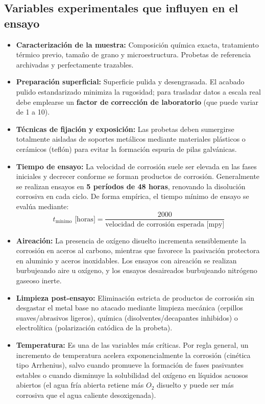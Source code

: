 \subsection{Variables experimentales que influyen en el ensayo}
\begin{itemize}
    \item \textbf{Caracterización de la muestra:} Composición química exacta, tratamiento térmico previo, tamaño de grano y microestructura. Probetas de referencia archivadas y perfectamente trazables.
    \item \textbf{Preparación superficial:} Superficie pulida y desengrasada. El acabado pulido estandarizado minimiza la rugosidad; para trasladar datos a escala real debe emplearse un \textbf{factor de corrección de laboratorio} (que puede variar de 1 a 10).
    \item \textbf{Técnicas de fijación y exposición:} Las probetas deben sumergirse totalmente aisladas de soportes metálicos mediante materiales plásticos o cerámicos (teflón) para evitar la formación espuria de pilas galvánicas.
    \item \textbf{Tiempo de ensayo:} La velocidad de corrosión suele ser elevada en las fases iniciales y decrecer conforme se forman productos de corrosión. Generalmente se realizan ensayos en \textbf{5 períodos de 48 horas}, renovando la disolución corrosiva en cada ciclo. De forma empírica, el tiempo mínimo de ensayo se evalúa mediante:
          \begin{equation}
              t_{\text{mínimo}} \text{ [horas]} = \frac{2000}{\text{velocidad de corrosión esperada [mpy]}}
              \label{eq:tiempo_minimo_ensayo}
          \end{equation}
    \item \textbf{Aireación:} La presencia de oxígeno disuelto incrementa sensiblemente la corrosión en aceros al carbono, mientras que favorece la pasivación protectora en aluminio y aceros inoxidables. Los ensayos con aireación se realizan burbujeando aire u oxígeno, y los ensayos desaireados burbujeando nitrógeno gaseoso inerte.
    \item \textbf{Limpieza post-ensayo:} Eliminación estricta de productos de corrosión sin desgastar el metal base no atacado mediante limpieza mecánica (cepillos suaves/abrasivos ligeros), química (disolventes/decapantes inhibidos) o electrolítica (polarización catódica de la probeta).
    \item \textbf{Temperatura:} Es una de las variables más críticas. Por regla general, un incremento de temperatura acelera exponencialmente la corrosión (cinética tipo Arrhenius), salvo cuando promueve la formación de fases pasivantes estables o cuando disminuye la solubilidad del oxígeno en líquidos acuosos abiertos (el agua fría abierta retiene más $O_2$ disuelto y puede ser más corrosiva que el agua caliente desoxigenada).
\end{itemize}

